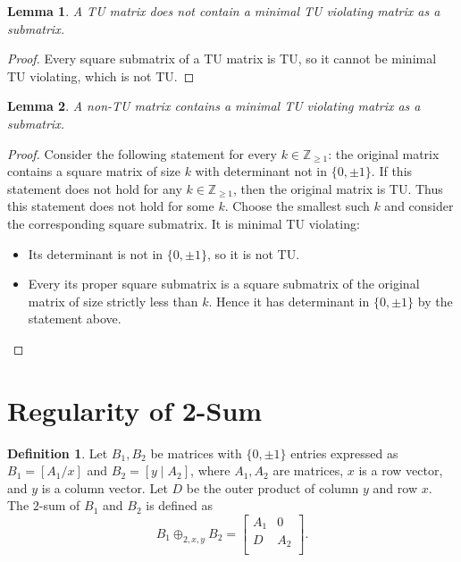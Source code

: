 \documentclass{article}
\newtheorem{lemma}{Lemma}
\theoremstyle{definition}
\newtheorem{definition}{Definition}
\begin{document}
\begin{lemma}
    A TU matrix does not contain a minimal TU violating matrix as a submatrix.
\end{lemma}

\begin{proof}
    Every square submatrix of a TU matrix is TU, so it cannot be minimal TU violating, which is not TU.
\end{proof}

\begin{lemma}
    A non-TU matrix contains a minimal TU violating matrix as a submatrix.
\end{lemma}

\begin{proof}
    Consider the following statement for every $k \in \mathbb{Z}_{\geq 1}$: the original matrix contains a square matrix of size $k$ with determinant not in $\{0, \pm 1\}$. If this statement does not hold for any $k \in \mathbb{Z}_{\geq 1}$, then the original matrix is TU. Thus this statement does not hold for some $k$. Choose the smallest such $k$ and consider the corresponding square submatrix. It is minimal TU violating:
    \begin{itemize}
        \item Its determinant is not in $\{0, \pm 1\}$, so it is not TU.
        \item Every its proper square submatrix is a square submatrix of the original matrix of size strictly less than $k$. Hence it has determinant in $\{0, \pm 1\}$ by the statement above.
    \end{itemize}
\end{proof}


\section{Regularity of 2-Sum}

\begin{definition}
    Let $B_{1}, B_{2}$ be matrices with $\{0, \pm 1\}$ entries expressed as $B_{1} = \left[A_{1} / x\right]$ and $B_{2} = \left[y \mid A_{2}\right]$, where $A_{1}, A_{2}$ are matrices, $x$ is a row vector, and $y$ is a column vector. Let $D$ be the outer product of column $y$ and row $x$. The $2$-sum of $B_{1}$ and $B_{2}$ is defined as
    \[
        B_{1} \oplus_{2, x, y} B_{2} = \begin{bmatrix}
            A_{1} & 0 \\
            D & A_{2} \\
        \end{bmatrix}.
    \]
\end{definition}
\end{document}
